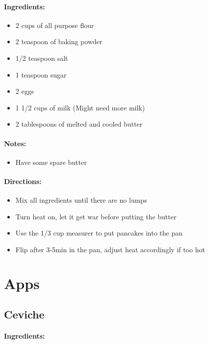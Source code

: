 \documentclass{article}
\begin{document}
\paragraph{Ingredients:}

\begin{itemize}
	\item 2 cups of all purpose flour 
	\item 2 teaspoon of baking powder 
	\item 1/2 teaspoon salt 
	\item 1 teaspoon sugar 
	\item 2 eggs 
	\item 1 1/2 cups of milk (Might need more milk)
	\item 2 tablespoons of melted and cooled butter
\end{itemize}

\paragraph{Notes:}
\begin{itemize}
	\item Have some spare butter
\end{itemize}

\paragraph{Directions:}
\begin{itemize}
	\item Mix all ingredients until there are no lumps 
	\item Turn heat on, let it get war before putting the butter 
	\item Use the 1/3 cup measurer to put pancakes into the pan 
	\item Flip after 3-5min in the pan, adjust heat accordingly if too hot
\end{itemize}

\section{Apps}

\subsection{Ceviche}

\paragraph{Ingredients:}
\end{document}
